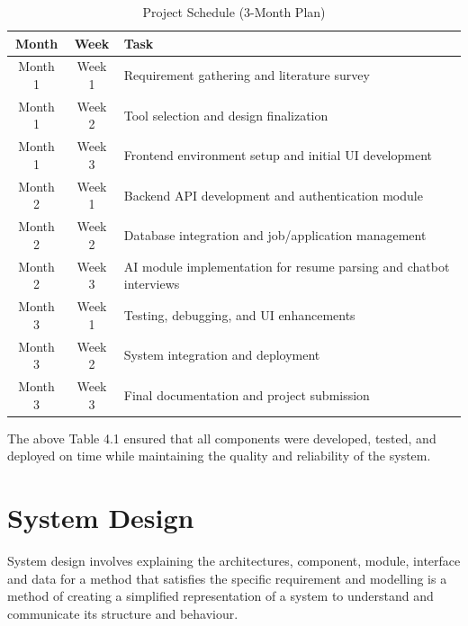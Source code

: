 \documentclass[a4paper, 12pt]{report}
\begin{document}
\begin{table}[h!]
\caption{Project Schedule (3-Month Plan)}
\centering
\renewcommand{\arraystretch}{1.3}
\begin{tabular}{|c|c|p{8.8cm}|}
\hline
\textbf{Month} & \textbf{Week} & \textbf{Task} \\ \hline
Month 1 & Week 1 & Requirement gathering and literature survey \\ \hline
Month 1 & Week 2 & Tool selection and design finalization \\ \hline
Month 1 & Week 3 & Frontend environment setup and initial UI development \\ \hline
Month 2 & Week 1 & Backend API development and authentication module \\ \hline
Month 2 & Week 2 & Database integration and job/application management \\ \hline
Month 2 & Week 3 & AI module implementation for resume parsing and chatbot interviews \\ \hline
Month 3 & Week 1 & Testing, debugging, and UI enhancements \\ \hline
Month 3 & Week 2 & System integration and deployment \\ \hline
Month 3 & Week 3 & Final documentation and project submission \\ \hline
\end{tabular}


\end{table}
\noindent The above Table 4.1 ensured that all components were developed, tested, and deployed on time while maintaining the quality and reliability of the system.

\chapter{System Design}

System design involves explaining the architectures, component, module, interface and data for a method that satisfies the specific requirement and modelling is a method of creating a simplified representation of a system to understand and communicate its structure and behaviour.
\end{document}
